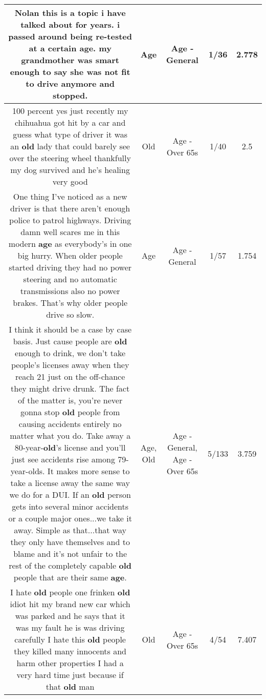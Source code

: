 \documentclass[11pt]{article}
\newlength\mylength
\begin{document}
\begin{center}
\begin{longtable}{|C{.65\mylength}|C{.30\mylength}|C{.12\mylength}|C{.12\mylength}|C{.12\mylength}|}
  \small Nolan this is a topic i have talked about for years. i passed around being re-tested at a certain \textbf{age}. my grandmother was smart enough to say she was not fit to drive anymore and stopped.\normalsize   & Age & Age - General & 1/36 & 2.778 \\  \hline
  \small 100 percent yes just recently my chihuahua got hit by a car and guess what type of driver it was an \textbf{old} lady that could barely see over the steering wheel thankfully my dog survived and he's healing very good\normalsize   & Old & Age - Over 65s & 1/40 & 2.5 \\  \hline
  \small One thing I've noticed as a new driver is that there aren't enough police to patrol highways. Driving damn well scares me in this modern \textbf{age} as everybody's in one big hurry. When older people started driving they had no power steering and no automatic transmissions also no power brakes. That's why older people drive so slow.\normalsize   & Age & Age - General & 1/57 & 1.754 \\  \hline
  \small I think it should be a case by case basis. Just cause people are \textbf{old} enough to drink, we don't take people's licenses away when they reach 21 just on the off-chance they might drive drunk. The fact of the matter is, you're never gonna stop \textbf{old} people from causing accidents entirely no matter what you do. Take away a 80-year-\textbf{old}'s license and you'll just see accidents rise among 79-year-olds. It makes more sense to take a license away the same way we do for a DUI. If an \textbf{old} person gets into several minor accidents or a couple major ones...we take it away. Simple as that...that way they only have themselves and to blame and it's not unfair to the rest of the completely capable \textbf{old} people that are their same \textbf{age}.\normalsize   & Age, Old & Age - General, Age - Over 65s & 5/133 & 3.759 \\  \hline
  \small I hate \textbf{old} people one frinken \textbf{old}  idiot hit my brand new car which was parked and he says that it was my fault  he is was driving carefully I hate this \textbf{old} people they killed many innocents and harm other properties I had a very hard time just because if that \textbf{old} man\normalsize   & Old & Age - Over 65s & 4/54 & 7.407 \\  \hline

\end{longtable}
\end{center}
\end{document}
